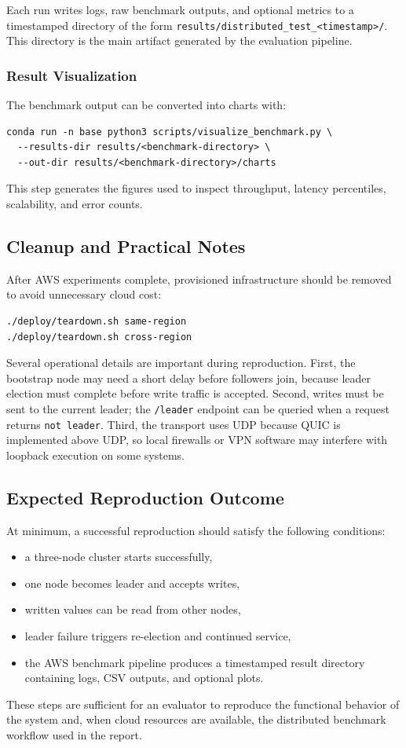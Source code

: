 Each run writes logs, raw benchmark outputs, and optional metrics to a timestamped directory of the form \texttt{results/distributed\_test\_<timestamp>/}. This directory is the main artifact generated by the evaluation pipeline.

\subsubsection{Result Visualization}

The benchmark output can be converted into charts with:
\begin{verbatim}
conda run -n base python3 scripts/visualize_benchmark.py \
  --results-dir results/<benchmark-directory> \
  --out-dir results/<benchmark-directory>/charts
\end{verbatim}

This step generates the figures used to inspect throughput, latency percentiles, scalability, and error counts.

\subsection{Cleanup and Practical Notes}

After AWS experiments complete, provisioned infrastructure should be removed to avoid unnecessary cloud cost:
\begin{verbatim}
./deploy/teardown.sh same-region
./deploy/teardown.sh cross-region
\end{verbatim}

Several operational details are important during reproduction. First, the bootstrap node may need a short delay before followers join, because leader election must complete before write traffic is accepted. Second, writes must be sent to the current leader; the \texttt{/leader} endpoint can be queried when a request returns \texttt{not leader}. Third, the transport uses UDP because QUIC is implemented above UDP, so local firewalls or VPN software may interfere with loopback execution on some systems.

\subsection{Expected Reproduction Outcome}

At minimum, a successful reproduction should satisfy the following conditions:
\begin{itemize}
\item a three-node cluster starts successfully,
\item one node becomes leader and accepts writes,
\item written values can be read from other nodes,
\item leader failure triggers re-election and continued service,
\item the AWS benchmark pipeline produces a timestamped result directory containing logs, CSV outputs, and optional plots.
\end{itemize}

These steps are sufficient for an evaluator to reproduce the functional behavior of the system and, when cloud resources are available, the distributed benchmark workflow used in the report.
